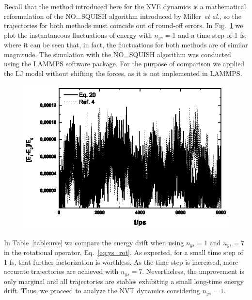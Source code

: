 \documentclass[aip,jcp,reprint,amsmath,amssymb,amsfont]{revtex4-1}
\begin{document}
Recall that the method introduced here for the NVE dynamics is a mathematical reformulation of the NO$\rule{0.25cm}{0.15mm}$SQUISH algorithm introduced by Miller~\textit{et al.}\cite{Miller2002}, so the trajectories for both methods must coincide out of round-off errors. In Fig.~\ref{fig:miller1fs} we plot the instantaneous fluctuations of energy with $n_{ys} = 1 $ and a time step of 1 fs, where it can be seen that, in fact, the fluctuations for both methods are of similar magnitude. The simulation with the NO$\rule{0.25cm}{0.15mm}$SQUISH algorithm was conducted using the LAMMPS\cite{Plimpton1995} software package. For the purpose of comparison we applied the LJ model without shifting the forces, as it is not implemented in LAMMPS.

\begin{figure}[!h]
\centering
\includegraphics{millerourmd}
\label{fig:miller1fs}
\end{figure}

In Table~\ref{table:nve} we compare the energy drift when using $n_{ys} = 1$ and $n_{ys} = 7$ in the rotational operator, Eq.~\ref{eq:ys_rot}. As expected, for a small time step of 1 fs, that further factorization is worthless. As the time step is increased, more accurate trajectories are achieved with $n_{ys} = 7 $. Nevertheless, the improvement is only marginal and all trajectories are stables exhibiting a small long-time energy drift. Thus, we proceed to analyze the NVT dynamics considering $n_{ys} = 1$.
\end{document}
